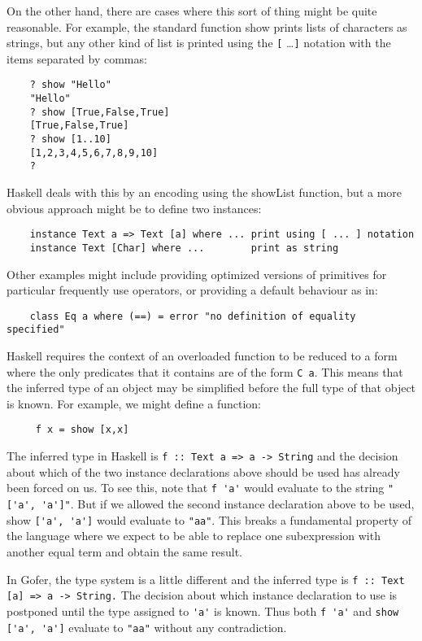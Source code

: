 On the other hand, there are cases where this sort of thing might be
quite reasonable.  For example, the standard function show prints lists
of characters as strings, but any other kind of list is printed using
the \verb"[" \dots \verb"]" notation with the items separated by commas:
\begin{verbatim}
    ? show "Hello"
    "Hello"
    ? show [True,False,True]
    [True,False,True]
    ? show [1..10]
    [1,2,3,4,5,6,7,8,9,10]
    ?
\end{verbatim}
Haskell deals with this by an encoding using the showList function, but
a more obvious approach might be to define two instances:
\begin{verbatim}
    instance Text a => Text [a] where ... print using [ ... ] notation
    instance Text [Char] where ...        print as string
\end{verbatim}
Other examples might include providing optimized versions of primitives
for particular frequently use operators, or providing a default
behaviour as in:
\begin{verbatim}
    class Eq a where (==) = error "no definition of equality specified"
\end{verbatim}
Haskell requires the context of an overloaded function to be reduced to
a form where the only predicates that it contains are of the form \verb"C a".
This means that the inferred type of an object may be simplified before
the full type of that object is known.  For example, we might define a
function:
\begin{verbatim}
     f x = show [x,x]
\end{verbatim}
The inferred type in Haskell is \verb"f :: Text a => a -> String" and the
decision about which of the two instance declarations above should be
used has already been forced on us.  To see this, note that \verb"f 'a'" would
evaluate to the string \verb/"['a', 'a']"/.  But if we allowed the second
instance declaration above to be used, show \verb"['a', 'a']" would evaluate
to \verb/"aa"/.  This breaks a fundamental property of the language where we
expect to be able to replace one subexpression with another equal term
and obtain the same result.

In Gofer, the type system is a little different and the inferred type
is \verb"f :: Text [a] => a -> String."  The decision about which instance
declaration to use is postponed until the type assigned to \verb"'a'" is
known.  Thus both \verb"f 'a'" and \verb"show ['a', 'a']" evaluate to \verb/"aa"/ without
any contradiction.

